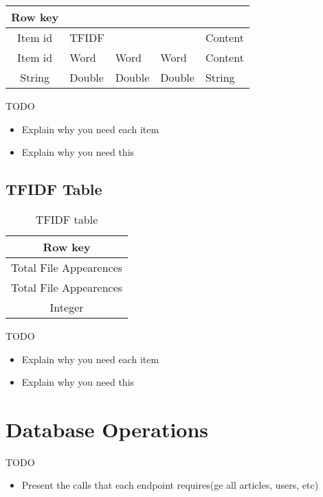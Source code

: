 \begin{table}[h]
\centering
\label{item-tabel-format-three}
\begin{tabular}{@{}|c|llll@{}}
\cmidrule(r){1-1}
Row key &  &  &  &  \\ \midrule
Item id & \multicolumn{1}{l|}{TFIDF} & \multicolumn{1}{l|}{} & \multicolumn{1}{l|}{} & \multicolumn{1}{l|}{Content} \\ \midrule
Item id & \multicolumn{1}{l|}{Word} & \multicolumn{1}{l|}{Word} & \multicolumn{1}{l|}{Word} & \multicolumn{1}{l|}{Content} \\ \midrule
String & \multicolumn{1}{l|}{Double} & \multicolumn{1}{l|}{Double} & \multicolumn{1}{l|}{Double} & \multicolumn{1}{l|}{String} \\ \bottomrule
\end{tabular}
\end{table}

TODO
\begin{itemize}
	\item Explain why you need each item
	\item Explain why you need this	
\end{itemize}

\subsection{TFIDF Table}
\label{sec:tfidf-table}

\begin{table}[!htbp]
\centering
\caption{TFIDF table }
\label{TFIDF-table}
\begin{tabular}{@{}|c|@{}}
\toprule
Row key \\ \midrule
Total File Appearences \\ \midrule
Total File Appearences \\ \midrule
Integer \\ \bottomrule
\end{tabular}
\end{table}

TODO
\begin{itemize}
	\item Explain why you need each item
	\item Explain why you need this	
\end{itemize}



\section{Database Operations}
\label{sec:database-operations}

TODO
\begin{itemize}
	\item Present the calls that each endpoint requires(ge all articles, users, etc)
\end{itemize}

